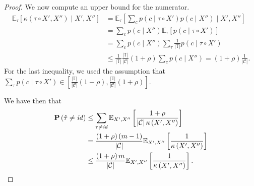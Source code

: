 \begin{proof}
We now compute an upper bound for the numerator.
%
\begin{align*}
\mathbb{E}_\tau \left[\kappa\left(\tau \circ X', X''\right) \mid X', X''\right]
&= \mathbb{E}_\tau \left[\sum_c p(c \mid \tau \circ X') p(c \mid X'') \mid X', X''\right]\\
&= \sum_c p(c \mid X'') \mathbb{E}_\tau \left[p(c \mid \tau \circ X')\right]\\
&= \sum_c p(c \mid X'') \sum_\tau \frac{1}{\left|\mathbb{T}\right|} p(c \mid \tau \circ X')\\
&\leq \frac{1}{\left|\mathbb{T}\right|}\frac{\left|\mathbb{T}\right|}{\left|\mathcal{C}\right|}(1 + \rho)\sum_c p(c \mid X'') = (1 + \rho)\frac{1}{\left|\mathcal{C}\right|}.
\end{align*}
%
For the last inequality, we used the assumption that $\sum_{\tau} p(c \mid \tau \circ X') \in \left[\frac{\left|\mathbb{T}\right|}{\left|\mathcal{C}\right|}(1 - \rho), \frac{\left|\mathbb{T}\right|}{\left|\mathcal{C}\right|}(1 + \rho)\right]$.

We have then that
%
\begin{align}
\mathbf{P}\left(\hat{\tau} \neq \mathit{id}\right) &\leq \sum_{\tau \neq \mathit{id}} \mathbb{E}_{X', X''}\left[\frac{1 + \rho}{\left|\mathcal{C}\right|\kappa\left(X', X''\right)}\right]\\
&= \frac{\left(1 + \rho\right)(m - 1)}{\left|\mathcal{C}\right|}\mathbb{E}_{X', X''}\left[\frac{1}{\kappa\left(X', X''\right)}\right]\\
&\leq \frac{\left(1 + \rho\right)m}{\left|\mathcal{C}\right|}\mathbb{E}_{X', X''}\left[\frac{1}{\kappa\left(X', X''\right)}\right].\label{eq:curr_upp_bound}
\end{align}
%


\end{proof}
